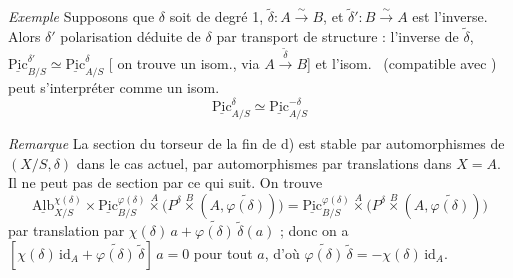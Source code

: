 \documentclass[11pt,a4paper]{article}
\begin{document}

\emph{Exemple} Supposons que $\delta$ soit de degré 1, \struck{\ill{}}
$\tilde{\delta} : A \xrightarrow{\sim} B$, et $\tilde{\delta}' : B \xrightarrow{\sim} A$
est l'inverse. Alors $\delta'$ \struck{\ill{}}  polarisation
déduite de $\delta$ par transport de structure : l'inverse de
$\tilde{\delta}$, $\underline{\mathrm{Pic}}^{\delta'}_{B/S} \simeq
\underline{\mathrm{Pic}}^{\delta}_{A/S}$ [\ill{} on trouve un isom., via
$A \xrightarrow{\tilde{\delta}} B$] et l'isom.\ 
(compatible \struck{\ill{}} avec \ill{})  peut s'interpréter
comme un isom.
\[
\underline{\mathrm{Pic}}^{\delta}_{A/S} \simeq \underline{\mathrm{Pic}}^{-\delta}_{A/S}
\]

\emph{Remarque} La section du torseur de la fin de d) est stable par
automorphismes de $(X/S, \delta)$ dans le cas actuel, \ill{} par
\struck{\ill{}} automorphismes par translations dans $X = A$. \ill{} Il ne peut
pas  \ill{} de section par ce qui suit. On trouve
\[
\underline{\mathrm{Alb}}^{\chi(\delta)}_{X/S} \times
\underline{\mathrm{Pic}}^{\varphi(\delta)}_{B/S} \overset{A}{\times}
\bigl(P^{\delta} \overset{B}{\times} (A, \widetilde{\varphi(\delta)})\bigr)
= \underline{\mathrm{Pic}}^{\varphi(\delta)}_{B/S} \overset{A}{\times}
\bigl(P^{\delta} \overset{B}{\times} (A, \widetilde{\varphi(\delta)})\bigr)
\]
par translation par \ill{}
$\chi(\delta)\, a + \widetilde{\varphi(\delta)}\, \tilde{\delta}(a)$ \struck{\ill{}} ;
donc on a $[\chi(\delta)\, \mathrm{id}_A + \widetilde{\varphi(\delta)}\, \tilde{\delta}]\, a = 0$
pour tout $a$, d'où \struck{\ill{}}
$\widetilde{\varphi(\delta)}\, \tilde{\delta} = -\chi(\delta)\, \mathrm{id}_A$.
\end{document}
